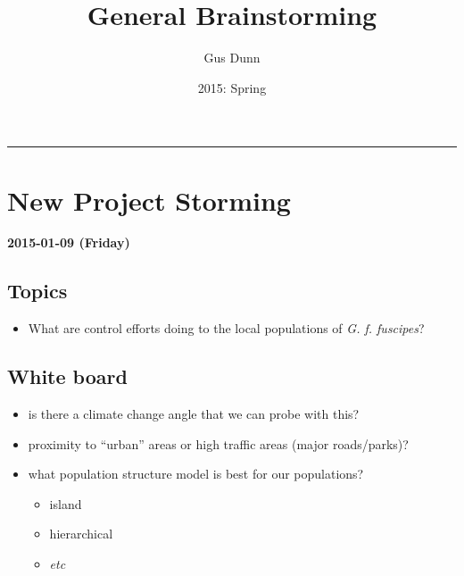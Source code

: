 \documentclass[letterpaper]{scrartcl}
\title{General Brainstorming\\\vspace{0.5em}{\large Caccone PostDoc}}
\author{Gus Dunn}
\date{2015: Spring}
\begin{document}
\maketitle

{
\hypersetup{linkcolor=black}
\setcounter{tocdepth}{3}
\tableofcontents
}
\begin{center}\rule{0.5\linewidth}{\linethickness}\end{center}

\section{New Project Storming}\label{new-project-storming}

\textbf{2015-01-09 (Friday)}

\subsection{Topics}\label{topics}

\begin{itemize}
\itemsep1pt\parskip0pt
\item
  What are control efforts doing to the local populations of \emph{G. f.
  fuscipes}?
\end{itemize}

\subsection{White board}\label{white-board}

\begin{itemize}
\itemsep1pt\parskip0pt
\item
  is there a climate change angle that we can probe with this?
\item
  proximity to ``urban'' areas or high traffic areas (major
  roads/parks)?
\item
  what population structure model is best for our populations?

  \begin{itemize}
  \itemsep1pt\parskip0pt
  \item
    island
  \item
    hierarchical
  \item
    \emph{etc}
  \end{itemize}
\end{itemize}
\end{document}
